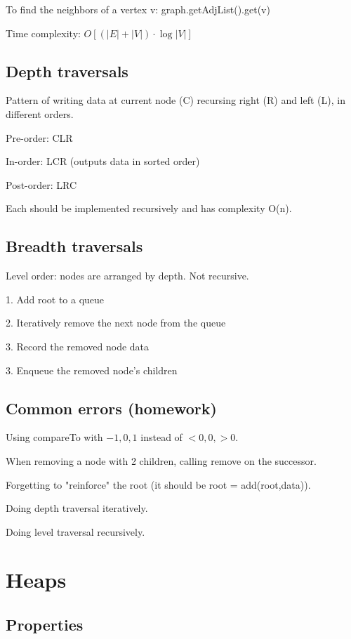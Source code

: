 \documentclass[english,openany]{book}
\begin{document}
    To find the neighbors of a vertex v: graph.getAdjList().get(v)

    Time complexity: $O[(|E| + |V|)\cdot \log |V|]$

    \section{Depth traversals}

	Pattern of writing data at current node (C) recursing right (R) and left (L), in different orders.

	Pre-order: CLR

	In-order: LCR (outputs data in sorted order)

	Post-order: LRC

	Each should be implemented recursively and has complexity O(n).\\

	\section{Breadth traversals}

	Level order: nodes are arranged by depth. Not recursive.

	1. Add root to a queue

	2. Iteratively remove the next node from the queue

	3. Record the removed node data

	3. Enqueue the removed node's children\\

	\section{Common errors (homework)}

	Using compareTo with $-1, 0, 1$ instead of $< 0, 0, >0$.

	When removing a node with 2 children, calling remove on the successor.

	Forgetting to "reinforce" the root (it should be root = add(root,data)).

	Doing depth traversal iteratively.

	Doing level traversal recursively.

	\chapter{Heaps}

    \section{Properties}
\end{document}
